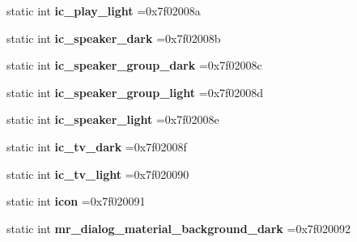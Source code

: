 \begin{DoxyCompactItemize}
static int {\bfseries ic\+\_\+play\+\_\+light} =0x7f02008a
\item 
\mbox{\label{classandroid_1_1support_1_1v7_1_1appcompat_1_1R_1_1drawable_acd0ac8de5c1ebf8f0a1d3d7b8798ea4e}} 
static int {\bfseries ic\+\_\+speaker\+\_\+dark} =0x7f02008b
\item 
\mbox{\label{classandroid_1_1support_1_1v7_1_1appcompat_1_1R_1_1drawable_a688daa483bf80fd2535a2eca22379196}} 
static int {\bfseries ic\+\_\+speaker\+\_\+group\+\_\+dark} =0x7f02008c
\item 
\mbox{\label{classandroid_1_1support_1_1v7_1_1appcompat_1_1R_1_1drawable_ab097686e8ad2eb2f1821bf4aadfdf5a4}} 
static int {\bfseries ic\+\_\+speaker\+\_\+group\+\_\+light} =0x7f02008d
\item 
\mbox{\label{classandroid_1_1support_1_1v7_1_1appcompat_1_1R_1_1drawable_a76a0a95a6c2d2a5995600de0d699675b}} 
static int {\bfseries ic\+\_\+speaker\+\_\+light} =0x7f02008e
\item 
\mbox{\label{classandroid_1_1support_1_1v7_1_1appcompat_1_1R_1_1drawable_aef34a5ade97ef1473d2049830af07dd9}} 
static int {\bfseries ic\+\_\+tv\+\_\+dark} =0x7f02008f
\item 
\mbox{\label{classandroid_1_1support_1_1v7_1_1appcompat_1_1R_1_1drawable_ab25ac0b2e2155a2818e1059e3bce1a81}} 
static int {\bfseries ic\+\_\+tv\+\_\+light} =0x7f020090
\item 
\mbox{\label{classandroid_1_1support_1_1v7_1_1appcompat_1_1R_1_1drawable_a145709d9aac16c12da81604fedf095fd}} 
static int {\bfseries icon} =0x7f020091
\item 
\mbox{\label{classandroid_1_1support_1_1v7_1_1appcompat_1_1R_1_1drawable_a726f2df20fd0a0dcf4ed1b776bfecbb0}} 
static int {\bfseries mr\+\_\+dialog\+\_\+material\+\_\+background\+\_\+dark} =0x7f020092

\end{DoxyCompactItemize}
